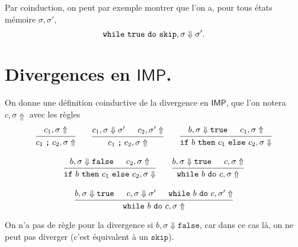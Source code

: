 \documentclass[../main]{subfiles}
\begin{document}
  Par coinduction, on peut par exemple montrer que l'on a, pour tous états mémoire $\sigma, \sigma'$, \[
    \texttt{while}\ \texttt{true}\ \texttt{do}\ \texttt{skip}, \sigma \Downarrow \sigma'
  .\] 

  \section{Divergences en $\mathsf{IMP}$.}

  On donne une définition coinductive de la divergence en $\mathsf{IMP}$, que l'on notera $c, \sigma \Uparrow$ avec les règles 
  \begin{gather*}
    \begin{prooftree}
      \hypo{c_1, \sigma \Uparrow}
      \infer 1{c_1 \col c_2, \sigma \Uparrow}
    \end{prooftree}
    \quad\quad
    \begin{prooftree}
      \hypo{c_1, \sigma \Downarrow \sigma'}
      \hypo{c_2, \sigma' \Uparrow}
      \infer 2{c_1 \col c_2, \sigma \Uparrow}
    \end{prooftree}
    \quad\quad
    \begin{prooftree}
      \hypo{b, \sigma \Downarrow \mathtt{true}}
      \hypo{c_1, \sigma \Uparrow}
      \infer 2{\ifte b {c_1} {c_2}, \sigma \Downarrow}
    \end{prooftree}\\[1em]
    \begin{prooftree}
      \hypo{b, \sigma \Downarrow \mathtt{false}}
      \hypo{c_2, \sigma \Uparrow}
      \infer 2{\ifte b {c_1} {c_2}, \sigma \Downarrow}
    \end{prooftree}
    \quad\quad
    \begin{prooftree}
      \hypo{b, \sigma \Downarrow \mathtt{true}}
      \hypo{c, \sigma \Uparrow}
      \infer 2{\while b c, \sigma \Uparrow}
    \end{prooftree}\\[1em]
    \begin{prooftree}
      \hypo{b, \sigma \Downarrow \mathtt{true}}
      \hypo{c, \sigma \Downarrow \sigma'}
      \hypo{\while b c, \sigma' \Uparrow}
      \infer 3{\while b c, \sigma \Uparrow}
    \end{prooftree}
  \end{gather*}

  On n'a pas de règle pour la divergence si $b, \sigma \Downarrow \mathtt{false}$, car dans ce cas là, on ne peut pas diverger (c'est équivalent à un $\mathtt{skip}$).
\end{document}

